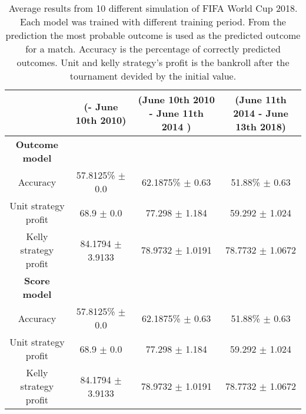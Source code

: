 \begin{sidewaystable}
    \caption{Average results from 10 different simulation of FIFA World Cup 2018. Each model was trained with different training period. From the prediction the most probable outcome is used as the predicted outcome for a match. Accuracy is the percentage of correctly predicted outcomes. Unit and kelly strategy's profit is the bankroll after the tournament devided by the initial value.}
    \begin{tabular}{ | c |c| c | c |}
    \hline
    & (- June 10th 2010) & (June 10th 2010 - June 11th 2014 ) & (June 11th 2014 - June 13th 2018) \\
    \hline
    \textbf{Outcome model} \\
    \hline
    Accuracy & 57.8125\% $\pm$ 0.0 & 62.1875\% $\pm$ 0.63 & 51.88\% $\pm$ 0.63 \\
    Unit strategy profit& 68.9 $\pm$ 0.0 & 77.298 $\pm$ 1.184 & 59.292 $\pm$ 1.024 \\
    Kelly strategy profit& 84.1794 $\pm$ 3.9133 & 78.9732 $\pm$ 1.0191 & 78.7732 $\pm$ 1.0672 \\
    \hline
    \textbf{Score model} \\
    \hline
    Accuracy & 57.8125\% $\pm$ 0.0 & 62.1875\% $\pm$ 0.63 & 51.88\% $\pm$ 0.63 \\
    Unit strategy profit& 68.9 $\pm$ 0.0 & 77.298 $\pm$ 1.184 & 59.292 $\pm$ 1.024 \\
    Kelly strategy profit& 84.1794 $\pm$ 3.9133 & 78.9732 $\pm$ 1.0191 & 78.7732 $\pm$ 1.0672 \\
    \hline
   \end{tabular}
\end{sidewaystable}

